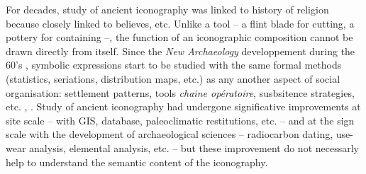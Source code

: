 \documentclass[article]{jss}
\begin{document}

For decades, study of ancient iconography was linked to history of religion because closely linked to believes, etc. Unlike a tool -- a flint blade for cutting, a pottery for containing --, the function of an iconographic composition cannot be drawn directly from itself. Since the \textit{New Archaeology} developpement during the 60's \citep{Clarke14}, symbolic expressions start to be studied with the same formal methods (statistics, seriations, distribution maps, etc.) as any another aspect of social organisation: settlement patterns, tools \emph{chaine opératoire}, susbsitence strategies, etc. \citep{Renfrew91}, \citep{LeroiGourhan92}. Study of ancient iconography had  undergone significative improvements at site scale -- with GIS, database, paleoclimatic restitutions, etc. -- and at the sign scale with the development of archaeological sciences -- radiocarbon dating, use-wear analysis, elemental analysis, etc. -- but these improvement do not necessarly help to understand the semantic content of the iconography.
\end{document}
